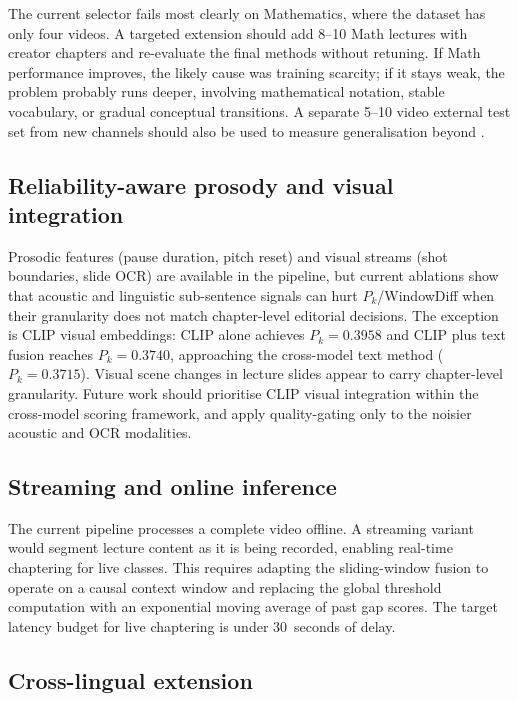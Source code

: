 The current selector fails most clearly on Mathematics, where the dataset has
only four videos. A targeted extension should add 8--10 Math lectures with
creator chapters and re-evaluate the final methods without retuning. If Math
performance improves, the likely cause was training scarcity; if it stays weak,
the problem probably runs deeper, involving mathematical notation, stable
vocabulary, or gradual conceptual transitions. A separate 5--10 video external
test set from new channels should also be used to measure generalisation beyond
\dataset{}.

\subsection{Reliability-aware prosody and visual integration}

Prosodic features (pause duration, pitch reset) and visual streams (shot
boundaries, slide OCR) are available in the pipeline, but current ablations
show that acoustic and linguistic sub-sentence signals can hurt
$P_k$/WindowDiff when their granularity does not match chapter-level editorial
decisions. The exception is CLIP visual embeddings: CLIP alone achieves
$P_k=0.3958$ and CLIP plus text fusion reaches $P_k=0.3740$, approaching the
cross-model text method ($P_k=0.3715$). Visual scene changes in lecture slides
appear to carry chapter-level granularity. Future work should prioritise CLIP
visual integration within the cross-model scoring framework, and apply
quality-gating only to the noisier acoustic and OCR modalities.

\subsection{Streaming and online inference}

The current pipeline processes a complete video offline.
A streaming variant would segment lecture content as it is being recorded,
enabling real-time chaptering for live classes.
This requires adapting the sliding-window fusion to operate on a causal context
window and replacing the global threshold computation with an exponential moving
average of past gap scores.
The target latency budget for live chaptering is under 30~seconds of delay.

\subsection{Cross-lingual extension}

